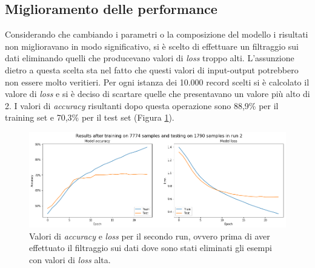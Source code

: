 \documentclass[12pt]{article}
\begin{document}
\subsection{Miglioramento delle performance}
Considerando che cambiando i parametri o la composizione del modello i risultati non miglioravano in modo significativo, si è scelto di effettuare un filtraggio sui dati eliminando quelli che producevano valori di \textit{loss} troppo alti. L'assunzione dietro a questa scelta sta nel fatto che questi valori di input-output potrebbero non essere molto veritieri.\newline
Per ogni istanza dei 10.000 record scelti si è calcolato il valore di \textit{loss} e si è deciso di scartare quelle che presentavano un valore più alto di 2. \newline
I valori di \textit{accuracy} risultanti dopo questa operazione sono 88,9\% per il training set e 70,3\% per il test set (Figura \ref{fig:run2}).

\begin{figure}[H]
\centering
\includegraphics[width=\textwidth]{images/accuracy_loss_run2.png}
\caption{Valori di \textit{accuracy} e \textit{loss} per il secondo run, ovvero prima di aver effettuato il filtraggio sui dati dove sono stati eliminati gli esempi con valori di \textit{loss} alta.}
\label{fig:run2}
\end{figure}
\end{document}
